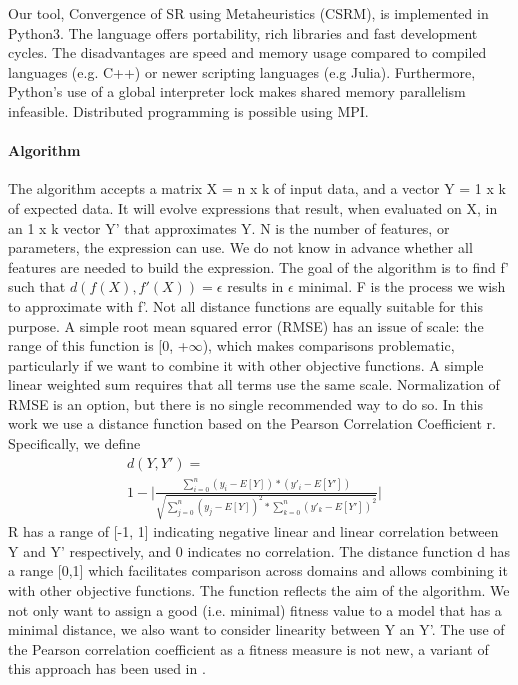 Our tool, Convergence of SR using Metaheuristics (CSRM), is implemented in Python3. The language offers portability, rich libraries and fast development cycles. The disadvantages are speed and memory usage compared to compiled languages (e.g. C++) or newer scripting languages (e.g Julia).
Furthermore, Python's use of a global interpreter lock makes shared memory parallelism infeasible. Distributed programming is possible using MPI.
\paragraph{Algorithm}
The algorithm accepts a matrix X = n x k of input data, and a vector Y = 1 x k of expected data. It will evolve expressions that result, when evaluated on X, in an 1 x k vector Y' that approximates Y. N is the number of features, or parameters, the expression can use. We do not know in advance whether all features are needed to build the expression.
The goal of the algorithm is to find f' such that $ d(f(X), f'(X))=\epsilon$ results in $\epsilon$ minimal. F is the process we wish to approximate with f'. Not all distance functions are equally suitable for this purpose. A simple root mean squared error (RMSE) has an issue of scale: the range of this function is [0, +$\infty$), which makes comparisons problematic, particularly if we want to combine it with other objective functions. A simple linear weighted sum requires that all terms use the same scale.
Normalization of RMSE is an option, but there is no single recommended way to do so.
In this work we use a distance function based on the Pearson Correlation Coefficient r. Specifically, we define
\begin{equation}
\begin{aligned}
d(Y, Y') = & \\ 1 - 
 \lvert \frac{\sum_{i=0}^{n}{(y_i-E[Y])*(y'_i-E[Y'])}}{\sqrt{\sum_{j=0}^{n}{(y_j-E[Y])^2}*\sum_{k=0}^{n}{(y'_k-E[Y'])^2}}}
\lvert 
\end{aligned}
\end{equation}
R has a range of [-1, 1] indicating negative linear and linear correlation between Y and Y' respectively, and 0 indicates no correlation. The distance function d has a range [0,1] which facilitates comparison across domains and allows combining it with other objective functions. The function reflects the aim of the algorithm. We not only want to assign a good (i.e. minimal) fitness value to a model that has a minimal distance, we also want to consider linearity between Y an Y'. The use of the Pearson correlation coefficient as a fitness measure is not new, a variant of this approach has been used in \citep{pearson}.

